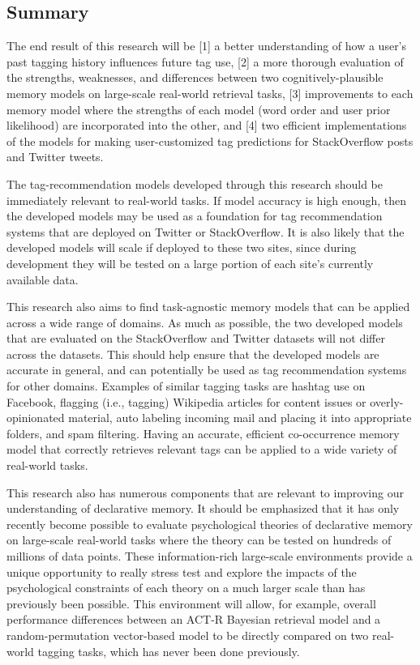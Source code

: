 \documentclass[man,floatsintext,donotrepeattitle]{apa6}
\begin{document}
\subsection{Summary}

The end result of this research will be [1] a better understanding of how a user's past tagging history influences future tag use,
[2] a more thorough evaluation of the strengths, weaknesses, and differences between two cognitively-plausible memory models on large-scale real-world retrieval tasks,
[3] improvements to each memory model where the strengths of each model (word order and user prior likelihood) are incorporated into the other,
and [4] two efficient implementations of the models for making user-customized tag predictions for StackOverflow posts and Twitter tweets. 

The tag-recommendation models developed through this research should be immediately relevant to real-world tasks.
If model accuracy is high enough, then the developed models may be used as a foundation for tag recommendation systems that are deployed on Twitter or StackOverflow.
It is also likely that the developed models will scale if deployed to these two sites, since during development they will be tested on a large portion of each site's currently available data.

This research also aims to find task-agnostic memory models that can be applied across a wide range of domains.
As much as possible, the two developed models that are evaluated on the StackOverflow and Twitter datasets will not differ across the datasets.
This should help ensure that the developed models are accurate in general, and can potentially be used as tag recommendation systems for other domains.
Examples of similar tagging tasks are hashtag use on Facebook, flagging (i.e., tagging) Wikipedia articles for content issues or overly-opinionated material,
auto labeling incoming mail and placing it into appropriate folders, and spam filtering.
Having an accurate, efficient co-occurrence memory model that correctly retrieves relevant tags can be applied to a wide variety of real-world tasks.

This research also has numerous components that are relevant to improving our understanding of declarative memory.
It should be emphasized that it has only recently become possible to evaluate psychological theories of declarative memory on large-scale real-world tasks where the theory can be tested on hundreds of millions of data points.
These information-rich large-scale environments provide a unique opportunity to really stress test and explore the impacts of the psychological constraints of each theory
on a much larger scale than has previously been possible.
This environment will allow, for example, overall performance differences between an ACT-R Bayesian retrieval model and a random-permutation vector-based model to be directly compared on two real-world tagging tasks,
which has never been done previously.
\end{document}

